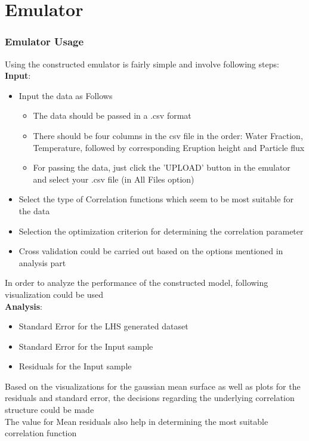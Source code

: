 \documentclass[10pt]{beamer}
\begin{document}
\section{Emulator}
\begin{frame}
\frametitle{Emulator Usage}
Using the constructed emulator is fairly simple and involve following steps:\\

{\bf Input}:
\begin{itemize}
    \item Input the data as Follows
    \begin{itemize}
        \item The data should be passed in a .csv format
        \item There should be four columns in the csv file in the order: Water Fraction, Temperature, followed by corresponding Eruption height and Particle flux
        \item For passing the data, just click the 'UPLOAD' button in the emulator and select your .csv file (in All Files option)
   \end{itemize}
    \item Select the type of Correlation functions which seem to be most suitable for the data
    \item Selection the optimization criterion for determining the correlation parameter
    \item Cross validation could be carried out based on the options mentioned in analysis part
\end{itemize}

\end{frame}
\begin{frame}
In order to analyze the performance of the constructed model, following visualization could be used \\
\vspace{4mm}
{\bf Analysis}:
\begin{itemize}
    \item Standard Error for the LHS generated dataset
    \item Standard Error for the Input sample
    \item Residuals for the Input sample
\end{itemize}
\vspace{4mm}
Based on the visualizations for the gaussian mean surface as well as plots for the residuals and standard error, the decisions regarding the underlying correlation structure could be made\\
\vspace{2mm}
The value for Mean residuals also help in determining the most suitable correlation function 
\end{frame}
\end{document}
